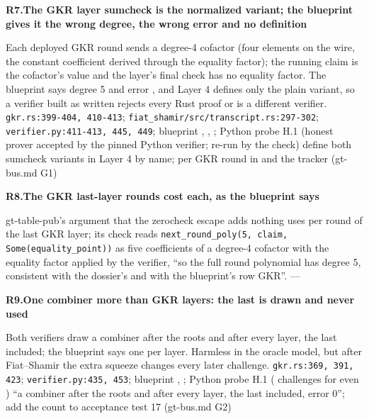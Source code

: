\par\medskip\noindent\textbf{R7.}\enspace\textbf{The GKR layer sumcheck is the normalized variant; the blueprint gives it the wrong degree, the wrong error and no definition}\par\nopagebreak
{} Each deployed GKR round sends a degree-4 cofactor (four elements on the wire, the constant coefficient derived through the equality factor); the running claim is the cofactor's value and the layer's final check has no equality factor. The blueprint says degree 5 and error , and Layer 4 defines only the plain variant, so a verifier built as written rejects every Rust proof or is a different verifier.
 \texttt{gkr.\allowbreak{}rs:\allowbreak{}399-\allowbreak{}404,\allowbreak{} 410-\allowbreak{}413}; \texttt{fiat\_\allowbreak{}shamir/\allowbreak{}src/\allowbreak{}transcript.\allowbreak{}rs:\allowbreak{}297-\allowbreak{}302}; \texttt{verifier.\allowbreak{}py:\allowbreak{}411-\allowbreak{}413,\allowbreak{} 445,\allowbreak{} 449}; blueprint , , ; Python probe H.1 (honest prover accepted by the pinned Python verifier; re-run by the check)
 define both sumcheck variants in Layer 4 by name;  per GKR round in  and the tracker (gt-bus.md G1)

\par\medskip\noindent\textbf{R8.}\enspace\textbf{The GKR last-layer rounds cost  each, as the blueprint says}\par\nopagebreak
{} gt-table-pub's argument that the zerocheck escape adds nothing uses  per round of the last GKR layer; its check reads \texttt{next\_\allowbreak{}round\_\allowbreak{}poly(\allowbreak{}5,\allowbreak{} claim,\allowbreak{} Some(\allowbreak{}equality\_\allowbreak{}point))} as five coefficients of a degree-4 cofactor with the equality factor applied by the verifier, ``so the full round polynomial has degree 5, consistent with the dossier's  and with the blueprint's row GKR''.
 
 —

\par\medskip\noindent\textbf{R9.}\enspace\textbf{One combiner more than GKR layers: the last is drawn and never used}\par\nopagebreak
{} Both verifiers draw a combiner after the roots and after every layer, the last included; the blueprint says one per layer. Harmless in the oracle model, but after Fiat–Shamir the extra squeeze changes every later challenge.
 \texttt{gkr.\allowbreak{}rs:\allowbreak{}369,\allowbreak{} 391,\allowbreak{} 423}; \texttt{verifier.\allowbreak{}py:\allowbreak{}435,\allowbreak{} 453}; blueprint , ; Python probe H.1 ( challenges for even )
 ``a combiner after the roots and after every layer, the last included, error 0''; add the count to acceptance test 17 (gt-bus.md G2)


